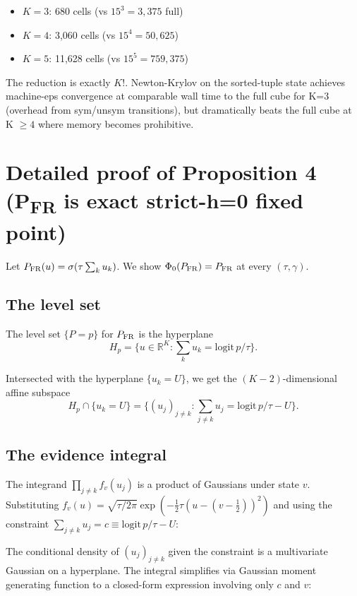 \documentclass[11pt]{article}
\newcommand{\R}{\mathbb{R}}
\newcommand{\1}{\mathbf{1}}
\newcommand{\PFR}{P_{\rm FR}}
\begin{document}
\begin{itemize}
\item $K=3$: 680 cells (vs $15^3 = 3{,}375$ full)
\item $K=4$: 3{,}060 cells (vs $15^4 = 50{,}625$)
\item $K=5$: 11{,}628 cells (vs $15^5 = 759{,}375$)
\end{itemize}

The reduction is exactly $K!$.  Newton-Krylov on the sorted-tuple
state achieves machine-eps convergence at comparable wall time to the
full cube for K=3 (overhead from sym/unsym transitions), but
dramatically beats the full cube at K $\ge 4$ where memory becomes
prohibitive.

\section{Detailed proof of Proposition 4 (P\textsubscript{FR} is exact strict-h=0 fixed point)}
\label{app:GS-proof}

Let $\PFR(u) = \sigma(\tau \sum_k u_k)$.  We show $\Phi_0(\PFR) = \PFR$
at every $(\tau, \gamma)$.

\subsection{The level set}

The level set $\{P = p\}$ for $\PFR$ is the hyperplane
\begin{equation}
H_p = \biggl\{u \in \R^K : \sum_k u_k = \mathrm{logit}\,p / \tau\biggr\}.
\end{equation}

Intersected with the hyperplane $\{u_k = U\}$, we get the
$(K-2)$-dimensional affine subspace
\begin{equation}
H_p \cap \{u_k = U\} = \biggl\{(u_j)_{j \ne k} : \sum_{j \ne k} u_j = \mathrm{logit}\,p / \tau - U\biggr\}.
\end{equation}

\subsection{The evidence integral}

The integrand $\prod_{j \ne k} f_v(u_j)$ is a product of Gaussians
under state $v$.  Substituting $f_v(u) = \sqrt{\tau/2\pi}\exp(-\tfrac12
\tau (u - (v-\tfrac12))^2)$ and using the constraint
$\sum_{j \ne k} u_j = c \equiv \mathrm{logit}\,p / \tau - U$:

The conditional density of $(u_j)_{j \ne k}$ given the constraint is a
multivariate Gaussian on a hyperplane.  The integral simplifies via
Gaussian moment generating function to a closed-form expression
involving only $c$ and $v$:
\end{document}
